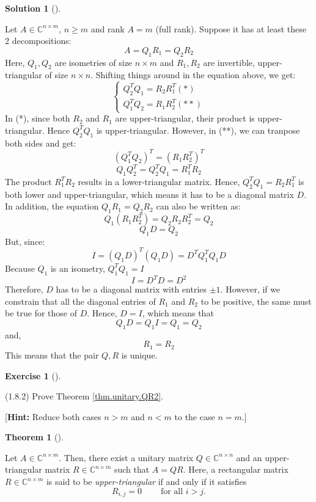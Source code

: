 \documentclass[numbers=enddot,12pt,final,onecolumn,notitlepage]{scrartcl}
\newcounter{exer}
\newcounter{sol}
\theoremstyle{definition}
\newtheorem{theo}{Theorem}[subsection]
\newenvironment{theorem}[1][]
{\begin{theo}[#1]\begin{leftbar}}
        {\end{leftbar}\end{theo}}
\newtheorem{exmp}[exer]{Exercise}
\newenvironment{exercise}[1][]
{\begin{exmp}[#1]\begin{leftbar}}
        {\end{leftbar}\end{exmp}}
\newtheorem{solu}[sol]{Solution}
\newenvironment{solution}[1][]
{\begin{solu}[#1]\begin{leftbar}}
        {\end{leftbar}\end{solu}}
\begin{document}
\begin{solution}
	Let $A \in \mathbb{C}^{n \times m}$, $n \geq m$ and rank $A = m$ (full rank). Suppose it has at least these 2 decompositions:
	\[
		A = Q_1 R_1 = Q_2 R_2
	\]
	Here, $Q_1, Q_2$ are isometries of size $n \times m$ and $R_1, R_2$ are invertible, upper-triangular of size $n \times n$. Shifting things around in the equation above, we get:
	\[
		\begin{cases}
			Q_2^{T}Q_1 = R_2R_1^{T} (\ast) \\
			Q_1^{T}Q_2 = R_1R_2^{T} (\ast\ast)
		\end{cases}
	\]
	In (*), since both $R_2$ and $R_1$ are upper-triangular, their product is upper-triangular. Hence $Q_2^{T}Q_1$ is upper-triangular. However, in (**), we can tranpose both sides and get:
	\[
		(Q_1^{T}Q_2)^{T} = (R_1R_2^{T})^{T}
	\]
	\[
		Q_1Q_2^{T} = Q_2^{T}Q_1 = R_1^{T}R_2
	\]
	The product $R_1^{T}R_2$ results in a lower-triangular matrix. Hence, $Q_2^{T}Q_1 = R_2R_1^{T}$ is both lower and upper-triangular, which means it has to be a diagonal matrix $D$. In addition, the equation $Q_1 R_1 = Q_2 R_2$ can also be written as:
	\[
		Q_1 (R_1 R_2^{T}) = Q_2 R_2 R_2^{T} = Q_2
	\]
	\[
		Q_1 D = Q_2
	\]
	But, since:
	\[
		I = (Q_1 D)^{T}(Q_1 D) = D^{T}Q_1^{T}Q_1 D
	\]
	Because $Q_1$ is an isometry, $Q_1^{T}Q_1 = I$
	\[
		I = D^{T} D = D^2
	\]
	Therefore, $D$ has to be a diagonal matrix with entries $\pm 1$. However, if we constrain that all the diagonal entries of $R_1$ and $R_2$ to be positive, the same must be true for those of $D$. Hence, $D = I$, which means that
	\[
		Q_1 D = Q_1 I = Q_1 = Q_2
	\]
	and,
	\[
		R_1 = R_2
	\]
	This means that the pair $Q, R$ is unique.

\end{solution}

\begin{exercise}
	\label{exe.unitary.QR2} (1.8.2) Prove Theorem \ref{thm.unitary.QR2}.

	[\textbf{Hint:} Reduce both cases $n>m$ and $n<m$ to the case $n=m$.]

	\begin{theorem}
		[QR factorization, unitary version]\label{thm.unitary.QR2}Let $A\in
			\mathbb{C}^{n\times m}$. Then, there exist a unitary matrix $Q\in
			\mathbb{C}^{n\times n}$ and an upper-triangular matrix $R\in\mathbb{C}%
			^{n\times m}$ such that $A=QR$. Here, a rectangular matrix $R\in
			\mathbb{C}^{n\times m}$ is said to be \emph{upper-triangular} if and only if
		it satisfies%
		\[
			R_{i,j}=0\ \ \ \ \ \ \ \ \ \ \text{for all }i>j.
		\]

	\end{theorem}
\end{exercise}
\end{document}
